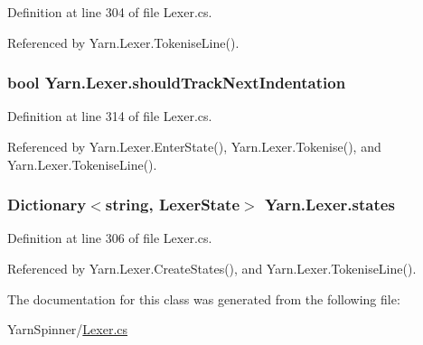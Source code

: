 Definition at line 304 of file Lexer.\-cs.



Referenced by Yarn.\-Lexer.\-Tokenise\-Line().

\hypertarget{a00117_ac670aac2245cbd4694dfbd5b69313218}{
\subsubsection[{should\-Track\-Next\-Indentation}]{\setlength{\rightskip}{0pt plus 5cm}bool Yarn.\-Lexer.\-should\-Track\-Next\-Indentation\hspace{0.3cm}{\ttfamily [private]}}}\label{a00117_ac670aac2245cbd4694dfbd5b69313218}


Definition at line 314 of file Lexer.\-cs.



Referenced by Yarn.\-Lexer.\-Enter\-State(), Yarn.\-Lexer.\-Tokenise(), and Yarn.\-Lexer.\-Tokenise\-Line().

\hypertarget{a00117_a2c65c0ba90f973e459583badefef216a}{
\subsubsection[{states}]{\setlength{\rightskip}{0pt plus 5cm}Dictionary$<$string, {\bf Lexer\-State}$>$ Yarn.\-Lexer.\-states\hspace{0.3cm}{\ttfamily [private]}}}\label{a00117_a2c65c0ba90f973e459583badefef216a}


Definition at line 306 of file Lexer.\-cs.



Referenced by Yarn.\-Lexer.\-Create\-States(), and Yarn.\-Lexer.\-Tokenise\-Line().



The documentation for this class was generated from the following file\-:\begin{DoxyCompactItemize}
\item 
Yarn\-Spinner/\hyperlink{a00292}{Lexer.\-cs}\end{DoxyCompactItemize}
